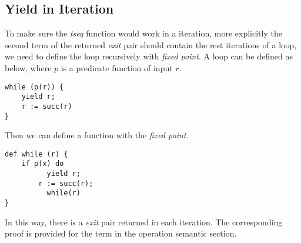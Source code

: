 \subsection{Yield in Iteration}
To make sure the \textit{tseq} function would work in a iteration, more explicitly the second term of the returned  \textit{exit} pair should contain the rest iterations of a loop, we need to define the loop recursively with \textit{fixed point}. A \while loop can be defined as below, where $p$ is a predicate function of input $r$.
\begin{lstlisting}[basicstyle=\small]
while (p(r)) {
	yield r; 
	r := succ(r)
}
\end{lstlisting}
Then we can define a \while function with the \textit{fixed point}.
\begin{lstlisting}[basicstyle=\small]
def while (r) {
	if p(x) do
		  yield r; 
	    r := succ(r);
		  while(r)
}
\end{lstlisting}
In this way, there is a \textit{exit} pair returned in each \while iteration. The corresponding proof is provided for the \while term in the operation semantic section.


